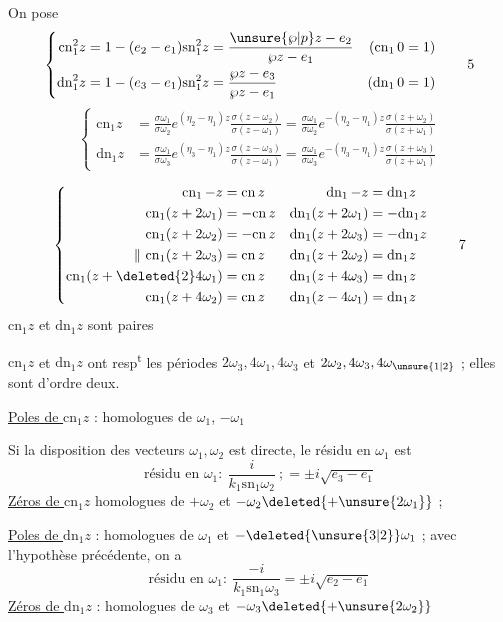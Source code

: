 On pose
\[
\left\{\begin{aligned}
\mathrm{cn}_1^2z&=1-(e_2-e_1)\mathrm{sn}_1^2z=\frac{\unsure{\wp|p}z-e_2}{\wp z-e_1}&(\mathrm{cn}_1\,0=1)\\
\mathrm{dn}_1^2z&=1-(e_3-e_1)\mathrm{sn}_1^2z=\frac{\wp z-e_3}{\wp z-e_1}&(\mathrm{dn}_1\,0=1)
\end{aligned}\right.\tag*{5}
\]
\[
\left\{\begin{aligned}
\mathrm{cn}_1z&=\frac{\sigma\omega_1}{\sigma\omega_2}e^{(\eta_2-\eta_1)z}\frac{\sigma(z-\omega_2)}{\sigma(z-\omega_1)}
=\frac{\sigma\omega_1}{\sigma\omega_2}e^{-(\eta_2-\eta_1)z}\frac{\sigma(z+\omega_2)}{\sigma(z+\omega_1)}\\
\mathrm{dn}_1z&=\frac{\sigma\omega_1}{\sigma\omega_3}e^{(\eta_3-\eta_1)z}\frac{\sigma(z-\omega_3)}{\sigma(z-\omega_1)}
=\frac{\sigma\omega_1}{\sigma\omega_3}e^{-(\eta_3-\eta_1)z}\frac{\sigma(z+\omega_3)}{\sigma(z+\omega_1)}
\end{aligned}\right.\tag*{6}
\]

\[
\left\{\begin{aligned}
\mathrm{cn}_1\,{-z}&=\mathrm{cn}\,z &\mathrm{dn}_1\,{-z}&=\mathrm{dn}_1z\\
\mathrm{cn}_1(z+2\omega_1)&=-\mathrm{cn}\,z &\mathrm{dn}_1(z+2\omega_1)&=-\mathrm{dn}_1z\\
\mathrm{cn}_1(z+2\omega_2)&=-\mathrm{cn}\,z &\mathrm{dn}_1(z+2\omega_{3})&=-\mathrm{dn}_1z\\
\Vert\ \mathrm{cn}_1(z+2\omega_3)&=\mathrm{cn}\,z &\mathrm{dn}_1(z+2\omega_2)&=\mathrm{dn}_1z\\
\mathrm{cn}_1(z+\deleted{2}4\omega_1)&=\mathrm{cn}\,z &\mathrm{dn}_1(z+4\omega_3)&=\mathrm{dn}_1z\\
\mathrm{cn}_1(z+4\omega_2)&=\mathrm{cn}\,z &\mathrm{dn}_1(z-4\omega_1)&=\mathrm{dn}_1z
\end{aligned}\right.\tag*{7}
\]
$\mathrm{cn}_1z$ et $\mathrm{dn}_1z$ sont paires

$\mathrm{cn}_1z$ et $\mathrm{dn}_1z$ ont resp\textsuperscript{t} les périodes $2\omega_3,4\omega_1,4\omega_3$ et $2\omega_2,4\omega_3,4\omega_{\unsure{1|2}}$ ; elles sont d'ordre deux.

\uline{Poles de $\mathrm{cn}_1z$} : homologues de $\omega_1$,   $-\omega_1$

Si la disposition des vecteurs $\omega_1,\omega_2$ est directe, le résidu en $\omega_1$ est
\[
\text{résidu en }\omega_1:\ \frac{i}{k_1\mathrm{sn}_1\omega_2}\ ;=\pm i\sqrt{e_3-e_1}
\]
\uline{Zéros de $\mathrm{cn}_1z$} homologues de $+\omega_2$ et $-\omega_2\deleted{+\unsure{2\omega_1}}$  ;

\uline{Poles de $\mathrm{dn}_1z$} : homologues de $\omega_1$ et $-\deleted{\unsure{3|2}}\omega_1$ ; avec l'hypothèse précédente, on a
\[
\text{résidu en }\omega_1:\ \frac{-i}{k_1\mathrm{sn}_1\omega_3}=\pm i\sqrt{e_2-e_1}
\]
\uline{Zéros de $\mathrm{dn}_1z$} : homologues de $\omega_3$ et $-\omega_3\deleted{+\unsure{2\omega_2}}$

